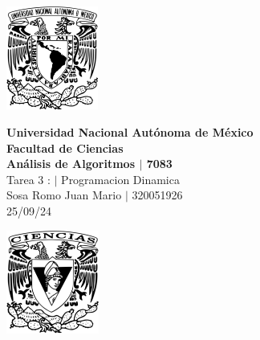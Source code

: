 \begin{center}
    \begin{minipage}{3cm}
    	\begin{center}
    		\includegraphics[height=3.4cm]{src/Img/Logo_UNAM.png}
    	\end{center}
    \end{minipage}\hfill
    \begin{minipage}{10cm}
    	\begin{center}
    	\textbf{\large Universidad Nacional Autónoma de México}\\[0.1cm]
        \textbf{Facultad de Ciencias}\\[0.1cm]
        \textbf{Análisis de Algoritmos  $|$ 7083}\\[0.1cm]
        Tarea 3 : $|$ Programacion Dinamica\\[0.1cm]
        Sosa Romo Juan Mario $|$ 320051926 \\[0.1cm]
        25/09/24
    	\end{center}
    \end{minipage}\hfill
    \begin{minipage}{3cm}
    	\begin{center}
    		\includegraphics[height=3.4cm]{src/Img/Logo_FC.png}
    	\end{center}
    \end{minipage}
\end{center}


